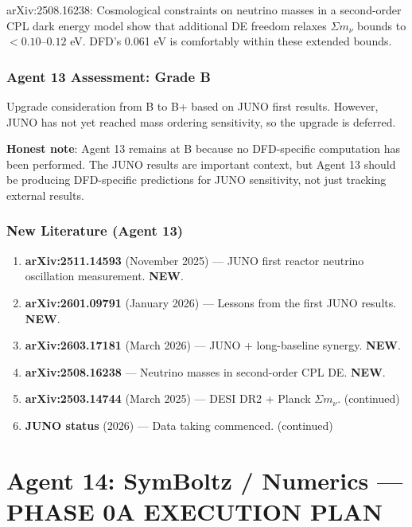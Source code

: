 \documentclass[11pt,a4paper]{article}
\newcommand{\NEW}{\textcolor{dfdblue}{\textbf{NEW}}}
\begin{document}
arXiv:2508.16238: Cosmological constraints on neutrino masses in a second-order CPL dark energy model show that additional DE freedom relaxes $\Sigma m_\nu$ bounds to $< 0.10$--$0.12$ eV. DFD's 0.061 eV is comfortably within these extended bounds.

\section{Agent 13 Assessment: Grade B}

Upgrade consideration from B to B+ based on JUNO first results. However, JUNO has not yet reached mass ordering sensitivity, so the upgrade is deferred.

\textbf{Honest note}: Agent 13 remains at B because no DFD-specific computation has been performed. The JUNO results are important context, but Agent 13 should be producing DFD-specific predictions for JUNO sensitivity, not just tracking external results.

\section{New Literature (Agent 13)}

\begin{enumerate}
\item \textbf{arXiv:2511.14593} (November 2025) --- JUNO first reactor neutrino oscillation measurement. \NEW.
\item \textbf{arXiv:2601.09791} (January 2026) --- Lessons from the first JUNO results. \NEW.
\item \textbf{arXiv:2603.17181} (March 2026) --- JUNO + long-baseline synergy. \NEW.
\item \textbf{arXiv:2508.16238} --- Neutrino masses in second-order CPL DE. \NEW.
\item \textbf{arXiv:2503.14744} (March 2025) --- DESI DR2 + Planck $\Sigma m_\nu$. (continued)
\item \textbf{JUNO status} (2026) --- Data taking commenced. (continued)
\end{enumerate}


\part{Agent 14: SymBoltz / Numerics --- PHASE 0A EXECUTION PLAN}
\label{part:agent14}
\end{document}
